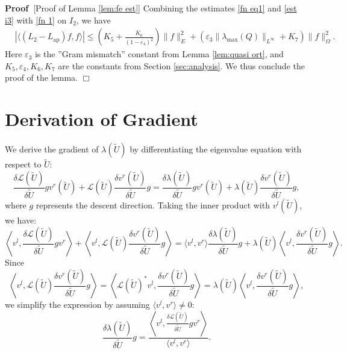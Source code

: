 \documentclass[11pt,a4paper]{article}
\numberwithin{equation}{section}
\newcommand{\tmop}[1]{\ensuremath{\operatorname{#1}}}
\newenvironment{proof}{\noindent\textbf{Proof\ }}{\hspace*{\fill}$\Box$\medskip}
\begin{document}
\begin{proof}[Proof of Lemma \ref{lem:fe est}]
Combining the estimates \eqref{fn eq1} and \eqref{est i3} with \eqref{fn 1} on $I_2$, we have   \[\begin{aligned}
    &|\langle (L_2 - L_{\tmop{ap}}) f, f \rangle |\leqslant (K_5+\frac{K_6}{(1-\varepsilon_4)^2})\| f\|_{E}^2+(\varepsilon_3\| \lambda_{\max} (Q) \|_{L^\infty}+K_7)\|f\|_{\Omega}^2.
\end{aligned}\]
Here $\varepsilon_3$ is the ''Gram mismatch'' constant from Lemma \ref{lem:quasi ort}, and $K_5,\varepsilon_4,K_6,K_7$ are the constants from Section \ref{sec:analysis}.
We thus conclude the proof of the lemma.
 \end{proof}




\section{Derivation of Gradient}\label{sec:nabla lambda}

We derive the gradient of $\lambda (\widetilde{U})$ by differentiating the
eigenvalue equation with respect to $\widetilde{U}$:
\[ \frac{\delta \mathcal{L} (\widetilde{U})}{\delta \widetilde{U}} g v^r (\widetilde{U})
   +\mathcal{L} (\widetilde{U})  \frac{\delta v^r (\widetilde{U})}{\delta \widetilde{U}} g
   = \frac{\delta \lambda (\widetilde{U})}{\delta \widetilde{U}} g v^r (\widetilde{U}) +
   \lambda (\widetilde{U})  \frac{\delta v^r (\widetilde{U})}{\delta \widetilde{U}} g, \]
where $g$ represents the descent direction. Taking the inner product with $v^l
(\widetilde{U})$, we have:
\[ \left\langle v^l, \frac{\delta \mathcal{L} (\widetilde{U})}{\delta \widetilde{U}} g
   v^r \right\rangle + \left\langle v^l, \mathcal{L} (\widetilde{U}) \frac{\delta
   v^r (\widetilde{U})}{\delta \widetilde{U}} g \right\rangle = \langle v^l, v^r
   \rangle \frac{\delta \lambda (\widetilde{U})}{\delta \widetilde{U}} g + \lambda
   (\widetilde{U})  \left\langle v^l, \frac{\delta v^r (\widetilde{U})}{\delta
   \widetilde{U}} g \right\rangle . \]
Since
\[ \left\langle v^l, \mathcal{L} (\widetilde{U})  \frac{\delta v^r
   (\widetilde{U})}{\delta \widetilde{U}} g \right\rangle = \left\langle \mathcal{L}
   (\widetilde{U})^{\ast} v^l, \frac{\delta v^r (\widetilde{U})}{\delta \widetilde{U}} g
   \right\rangle = \lambda (\widetilde{U})  \left\langle v^l, \frac{\delta v^r
   (\widetilde{U})}{\delta \widetilde{U}} g \right\rangle, \]
we simplify the expression by assuming $ \langle v^l, v^r \rangle \neq 0$:
\[ \frac{\delta \lambda (\widetilde{U})}{\delta \widetilde{U}} g = \frac{\left\langle
   v^l, \frac{\delta \mathcal{L} (\widetilde{U})}{\delta \widetilde{U}} g v^r
   \right\rangle}{\langle v^l, v^r \rangle} . \]
   
\end{document}
